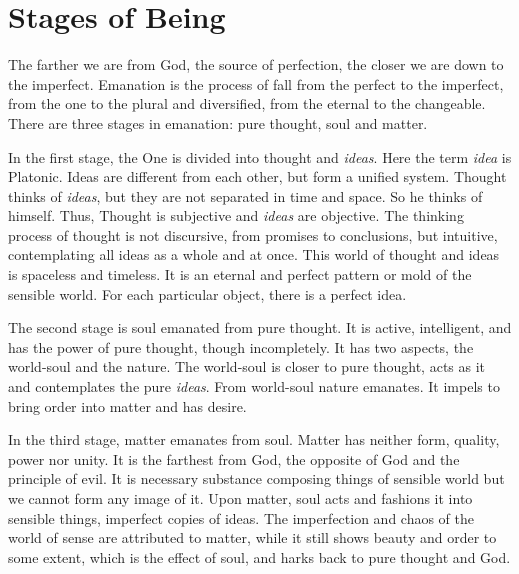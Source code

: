 \documentclass[11pt]{article}
\begin{document}
\section{Stages of Being}
The farther we are from God, the source of perfection, the closer we are down to the imperfect. 
Emanation is the process of fall from the perfect to the imperfect, from the one to the plural and diversified, from the eternal to the changeable. 
There are three stages in emanation: pure thought, soul and matter.

\newline

In the first stage, the One is divided into thought and \textit{ideas}. 
Here the term \textit{idea} is Platonic. 
Ideas are different from each other, but form a unified system. 
Thought thinks of \textit{ideas}, but they are not separated in time and space. 
So he thinks of himself. 
Thus, Thought is subjective and \textit{ideas} are objective. 
The thinking process of thought is not discursive, from promises to conclusions, but intuitive, contemplating all ideas as a whole and at once. 
This world of thought and ideas is spaceless and timeless. 
It is an eternal and perfect pattern or mold of the sensible world. 
For each particular object, there is a perfect idea.

\newline

The second stage is soul emanated from pure thought. 
It is active, intelligent, and has the power of pure thought, though incompletely. 
It has two aspects, the world-soul and the nature. 
The world-soul is closer to pure thought, acts as it and contemplates the pure \textit{ideas}. 
From world-soul nature emanates. 
It impels to bring order into matter and has desire.

\newline

In the third stage, matter emanates from soul. 
Matter has neither form, quality, power nor unity. 
It is the farthest from God, the opposite of God and the principle of evil. 
It is necessary substance composing things of sensible world but we cannot form any image of it. 
Upon matter, soul acts and fashions it into sensible things, imperfect copies of ideas. 
The imperfection and chaos of the world of sense are attributed to matter, while it still shows beauty and order to some extent, which is the effect of soul, and harks back to pure thought and God.
\end{document}
